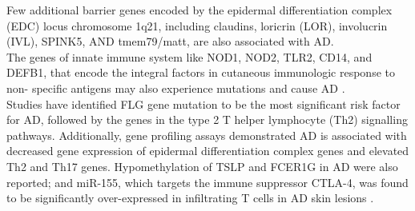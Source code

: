 \documentclass[journal, a4paper]{IEEEtran}
\begin{document}
Few additional barrier genes encoded by the epidermal differentiation complex (EDC) locus chromosome 1q21, including claudins, loricrin (LOR), involucrin (IVL), SPINK5, AND tmem79/matt, are also associated with AD.\\

The genes of innate immune system like NOD1, NOD2, TLR2, CD14, and DEFB1, that encode the integral factors in cutaneous immunologic response to non- specific antigens may also experience mutations and cause AD \cite{guttman2017atopic}.\\

Studies have identified FLG gene mutation to be the most significant risk factor for AD, followed by the genes in the type 2 T helper lymphocyte (Th2) signalling pathways. 
Additionally, gene profiling assays demonstrated AD is associated with decreased gene expression of epidermal differentiation complex genes and elevated Th2 and Th17 genes. Hypomethylation of TSLP and FCER1G in AD were also reported; and miR-155, which targets the immune suppressor CTLA-4, was found to be significantly over-expressed in infiltrating T cells in AD skin lesions \cite{guttman2017atopic, bin2016genetic}.\\




\end{document}
